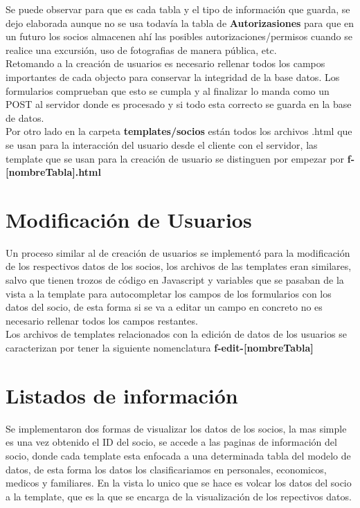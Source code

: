 Se puede observar para que es cada tabla y el tipo de información que guarda, se dejo elaborada aunque no se usa todavía la tabla de \textbf{Autorizasiones} para que en un futuro los socios almacenen ahí las posibles autorizaciones/permisos
cuando se realice una excursión, uso de fotografias de manera pública, etc.\\

Retomando a la creación de usuarios es necesario rellenar todos los campos importantes de cada objecto para conservar la integridad de la base datos. Los formularios comprueban que esto se cumpla y al finalizar lo manda como un POST
al servidor donde es procesado y si todo esta correcto se guarda en la base de datos.\\

Por otro lado en la carpeta \textbf{templates/socios} están todos los archivos .html que se usan para la interacción del usuario desde el cliente con el servidor, las template que se usan para la creación de usuario se distinguen por 
empezar por \textbf{f-[nombreTabla].html}


\section{Modificación de Usuarios}
\label{4:sec6}
Un proceso similar al de creación de usuarios se implementó para la modificación de los respectivos datos de los socios, los archivos de las templates eran similares, salvo que tienen trozos de código en Javascript
y variables que se pasaban de la vista a la template para autocompletar los campos de los formularios con los datos del socio, de esta forma si se va a editar un campo en concreto no es necesario rellenar 
todos los campos restantes.\\

Los archivos de templates relacionados con la edición de datos de los usuarios se caracterizan por tener la siguiente nomenclatura \textbf{f-edit-[nombreTabla]}
\section{Listados de información}
\label{4:sec7}
Se implementaron dos formas de visualizar los datos de los socios, la mas simple es una vez obtenido el ID del socio, se accede a las paginas de información del socio, donde cada template esta enfocada a una determinada tabla
del modelo de datos, de esta forma los datos los clasificariamos en personales, economicos, medicos y familiares. En la vista lo unico que se hace es volcar los datos del socio a la template, que es la que se encarga de 
la visualización de los repectivos datos.

